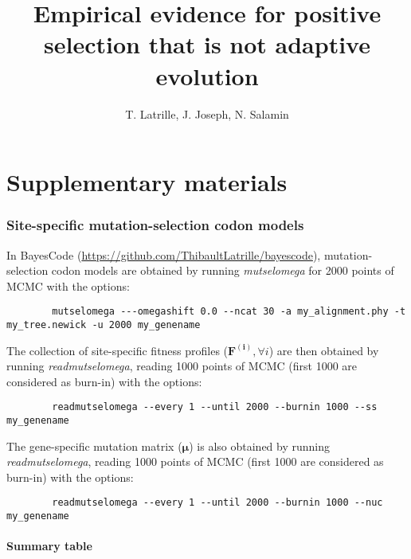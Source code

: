 \documentclass{article}
\title{Empirical evidence for positive selection that is not adaptive evolution}
\author{
    \large
    T. {Latrille}, J. {Joseph}, N. {Salamin}\\
}
\newcommand{\UniDimArray}[1]{\bm{#1}}
\begin{document}
    \maketitle
    \part*{Supplementary materials}
    \tableofcontents
    \clearpage

    \section{Site-specific mutation-selection codon models}

    In BayesCode (\url{https://github.com/ThibaultLatrille/bayescode}), mutation-selection codon models are obtained by running \textit{mutselomega} for 2000 points of MCMC with the options:
    \begin{scriptsize}
        \begin{verbatim}
        mutselomega ---omegashift 0.0 --ncat 30 -a my_alignment.phy -t my_tree.newick -u 2000 my_genename
        \end{verbatim}
    \end{scriptsize}
    The collection of site-specific fitness profiles ($\UniDimArray{F^{(i)}}, \forall i$) are then obtained by running \textit{readmutselomega}, reading 1000 points of MCMC (first 1000 are considered as burn-in) with the options:
    \begin{scriptsize}
        \begin{verbatim}
        readmutselomega --every 1 --until 2000 --burnin 1000 --ss my_genename
        \end{verbatim}
    \end{scriptsize}
    The gene-specific mutation matrix ($\UniDimArray{\mu}$) is also obtained by running \textit{readmutselomega}, reading 1000 points of MCMC (first 1000 are considered as burn-in) with the options:
    \begin{scriptsize}
        \begin{verbatim}
        readmutselomega --every 1 --until 2000 --burnin 1000 --nuc my_genename
        \end{verbatim}
    \end{scriptsize}

    \subsection{Summary table}
\end{document}
